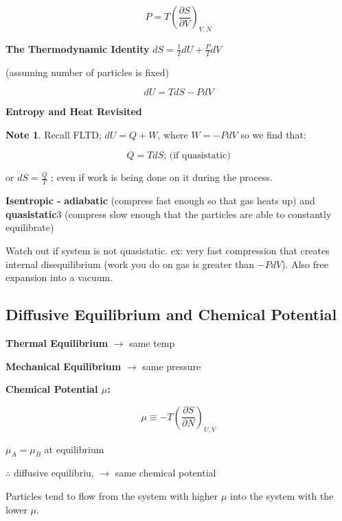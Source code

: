 \documentclass[11pt]{article}
\theoremstyle{definition}
\newtheorem{note}{Note}
\begin{document}
\begin{equation}
    P = T \left(\frac{\partial S}{\partial V} \right)_{V, N}
\end{equation}


\textbf{The Thermodynamic Identity}
$dS = \frac{1}{T}dU + \frac{P}{T} dV$

(assuming number of particles is fixed)

\begin{equation}
    dU = TdS - PdV
\end{equation}

\textbf{Entropy and Heat Revisited}
\begin{note}
Recall FLTD; $dU = Q + W$, where $W= -PdV$ so we find that:
\end{note}

\begin{equation}
    Q = TdS \text{; (if quasistatic)}
\end{equation}

or $dS = \frac{Q}{T}$ ; even if work is being done on it during the process.

\textbf{Isentropic - } \textbf{adiabatic} (compress fast enough so that gas heats up) and \textbf{quasistatic}3 (compress slow enough that the particles are able to constantly equilibrate)

Watch out if system is not quasistatic. ex: very fast compression that creates internal disequilibrium (work you do on gas is greater than $-PdV$). Also free expansion into a vacuum.

\subsection{Diffusive Equilibrium and Chemical Potential}

\textbf{Thermal Equilibrium} $\rightarrow$ same temp

\textbf{Mechanical Equilibrium} $\rightarrow$ same pressure

\textbf{Chemical Potential $\mu$:}

\begin{equation}
    \mu \equiv -T \left(\frac{\partial S}{\partial N}\right)_{U,V}
\end{equation}

$\mu_A = \mu_B$ at equilibrium

$\therefore$ diffusive equilibriu, $\rightarrow$ same chemical potential

Particles tend to flow from the system with higher $\mu$ into the system with the lower $\mu$.
\end{document}
